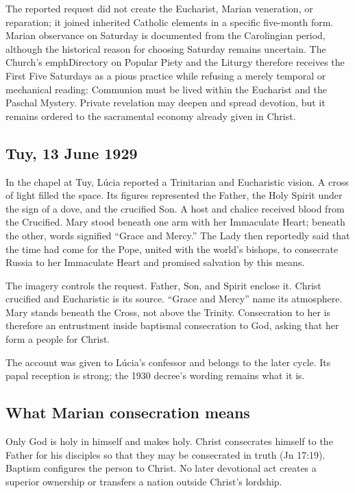 The reported request did not create the Eucharist, Marian veneration, or reparation; it joined inherited Catholic elements in a specific five-month form. Marian observance on Saturday is documented from the Carolingian period, although the historical reason for choosing Saturday remains uncertain. The Church's emph{Directory on Popular Piety and the Liturgy} therefore receives the First Five Saturdays as a pious practice while refusing a merely temporal or mechanical reading: Communion must be lived within the Eucharist and the Paschal Mystery. Private revelation may deepen and spread devotion, but it remains ordered to the sacramental economy already given in Christ.

\subsection{Tuy, 13 June 1929}

In the chapel at Tuy, Lúcia reported a Trinitarian and Eucharistic vision. A cross of light filled the space. Its figures represented the Father, the Holy Spirit under the sign of a dove, and the crucified Son. A host and chalice received blood from the Crucified. Mary stood beneath one arm with her Immaculate Heart; beneath the other, words signified “Grace and Mercy.” The Lady then reportedly said that the time had come for the Pope, united with the world's bishops, to consecrate Russia to her Immaculate Heart and promised salvation by this means.

The imagery controls the request. Father, Son, and Spirit enclose it. Christ crucified and Eucharistic is its source. “Grace and Mercy” name its atmosphere. Mary stands beneath the Cross, not above the Trinity. Consecration to her is therefore an entrustment inside baptismal consecration to God, asking that her  form a people for Christ.

The account was given to Lúcia's confessor and belongs to the later cycle. Its papal reception is strong; the 1930 decree's wording remains what it is.

\subsection{What Marian consecration means}

Only God is holy in himself and makes holy. Christ consecrates himself to the Father for his disciples so that they may be consecrated in truth (Jn 17:19). Baptism configures the person to Christ. No later devotional act creates a superior ownership or transfers a nation outside Christ's lordship.

